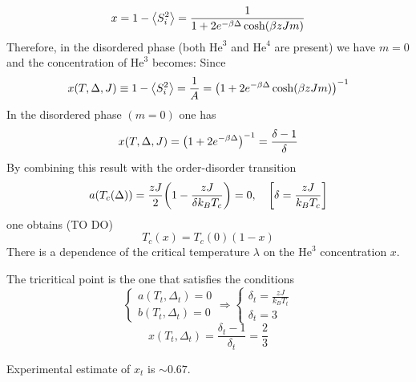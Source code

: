 \documentclass[../main/main.tex]{subfiles}
\begin{document}
\begin{equation*}
    x = 1 - \expval{S_i^2} = \frac{1}{ 1 + 2 e^{-\beta \Delta } \cosh (\beta z J m)}
\end{equation*}
Therefore, in the disordered phase (both 
\( \text{He}^3 \) and \( \text{He}^4 \) are present) we have \(m=0\) and the concentration of \( \text{He}^3 \) becomes:
Since
\begin{equation}
  x (T, \Delta , J) \equiv  1 - \expval{S_i^2} = \frac{1}{A} = \qty(1 + 2 e^{-\beta \Delta }  \cosh (\beta z J m))^{-1}
\end{equation}
In the disordered phase \( (m=0) \) one has
\begin{equation}
  x (T,\Delta , J) = \qty(1 + 2 e^{-\beta \Delta } )^{-1} = \frac{\delta -1}{\delta }
\end{equation}
By combining this result with the order-disorder transition
\begin{equation}
  a (T_c (\Delta )) = \frac{z J}{2} \qty(1 - \frac{z J}{\delta k_B T_c}) = 0, \quad \qty[\delta = \frac{z J}{k_B T_c}]
\end{equation}
one obtains (TO DO)
\begin{equation}
  T_c (x) = T_c (0) (1-x)
\end{equation}
There is a dependence of the critical temperature \( \lambda  \) on the \( \text{He}^3 \) concentration \( x \).

The tricritical point is the one that satisfies the conditions
  \begin{equation}
    \begin{cases}
     a (T_t, \Delta _t) = 0 \\
     b (T_t, \Delta _t) = 0
    \end{cases} \Rightarrow
    \begin{cases}
      \delta _t = \frac{zJ}{k_B T_t} \\
      \delta _t = 3
    \end{cases}
\end{equation}
\begin{equation}
  x (T_t, \Delta _t) = \frac{\delta _t - 1}{\delta _t} = \frac{2}{3}
\end{equation}
\begin{remark}
Experimental estimate of \( x_t \) is \( \sim 0.67 \).
\end{remark}
\end{document}
